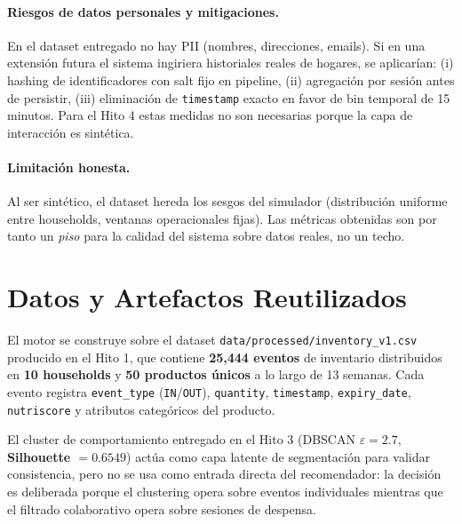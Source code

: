 \documentclass[12pt,a4paper]{article}
\newcommand{\metric}[1]{\textcolor{metricblue}{\textbf{#1}}}
\newcommand{\code}[1]{\texttt{\small #1}}
\begin{document}
\paragraph{Riesgos de datos personales y mitigaciones.} En el dataset entregado no hay PII (nombres, direcciones, emails). Si en una extensión futura el sistema ingiriera historiales reales de hogares, se aplicarían: (i) hashing de identificadores con salt fijo en pipeline, (ii) agregación por sesión antes de persistir, (iii) eliminación de \code{timestamp} exacto en favor de bin temporal de 15 minutos. Para el Hito 4 estas medidas no son necesarias porque la capa de interacción es sintética.

\paragraph{Limitación honesta.} Al ser sintético, el dataset hereda los sesgos del simulador (distribución uniforme entre households, ventanas operacionales fijas). Las métricas obtenidas son por tanto un \textit{piso} para la calidad del sistema sobre datos reales, no un techo.

\section{Datos y Artefactos Reutilizados}

El motor se construye sobre el dataset \code{data/processed/inventory\_v1.csv} producido en el Hito 1, que contiene \metric{25{,}444 eventos} de inventario distribuidos en \metric{10 households} y \metric{50 productos únicos} a lo largo de 13 semanas. Cada evento registra \code{event\_type} (\code{IN}/\code{OUT}), \code{quantity}, \code{timestamp}, \code{expiry\_date}, \code{nutriscore} y atributos categóricos del producto.

El cluster de comportamiento entregado en el Hito 3 (DBSCAN $\varepsilon = 2.7$, \metric{Silhouette $= 0.6549$}) actúa como capa latente de segmentación para validar consistencia, pero no se usa como entrada directa del recomendador: la decisión es deliberada porque el clustering opera sobre eventos individuales mientras que el filtrado colaborativo opera sobre sesiones de despensa.

\end{document}
